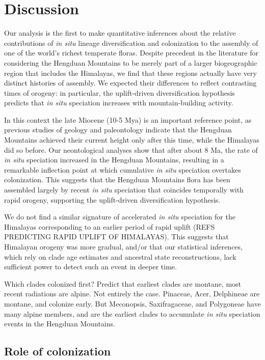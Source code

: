 \section{Discussion}

Our analysis is the first to make quantitative inferences about the relative contributions of \textit{in situ} lineage diversification and colonization to the assembly of one of the world's richest temperate floras. Despite precedent in the literature for considering the Hengduan Mountains to be merely part of a larger biogeographic region that includes the Himalayas, we find that these regions actually have very distinct histories of assembly. We expected their differences to reflect contrasting times of orogeny: in particular, the uplift-driven diversification hypothesis predicts that \textit{in situ} speciation increases with mountain-building activity.

In this context the late Miocene (10-5 Mya) is an important reference point, as previous studies of geology and paleontology indicate that the Hengduan Mountains achieved their current height only after this time, while the Himalayas did so before. Our neontological analyses show that after about 8 Ma, the rate of \textit{in situ} speciation increased in the Hengduan Mountains, resulting in a remarkable inflection point at which cumulative \textit{in situ} speciation overtakes colonization. This suggests that the Hengduan Mountains flora has been assembled largely by recent \textit{in situ} speciation that coincides temporally with rapid orogeny, supporting the uplift-driven diversification hypothesis.

We do not find a similar signature of accelerated \textit{in situ} speciation for the Himalayas corresponding to an earlier period of rapid uplift (REFS PREDICTING RAPID UPLIFT OF HIMALAYAS). This suggests that Himalayan orogeny was more gradual, and/or that our statistical inferences, which rely on clade age estimates and ancestral state reconstructions, lack sufficient power to detect such an event in deeper time.

Which clades colonized first? Predict that earliest clades are montane, most recent radiations are alpine. Not entirely the case. Pinaceae, Acer, Delphineae are montane, and colonize early. But Meconopsis, Saxifragaceae, and Polygoneae have many alpine members, and are the earliest clades to accumulate \textit{in situ} speciation events in the Hengduan Mountains.

\subsection{Role of colonization}

